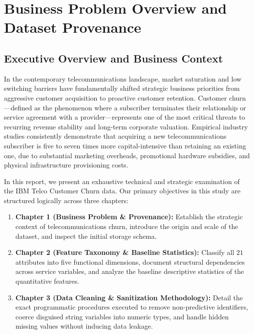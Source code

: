 \section{ Business Problem Overview and Dataset Provenance}

\subsection{Executive Overview and Business Context}
In the contemporary telecommunications landscape, market saturation and low switching barriers have fundamentally shifted strategic business priorities from aggressive customer acquisition to proactive customer retention. Customer churn---defined as the phenomenon where a subscriber terminates their relationship or service agreement with a provider---represents one of the most critical threats to recurring revenue stability and long-term corporate valuation. Empirical industry studies consistently demonstrate that acquiring a new telecommunications subscriber is five to seven times more capital-intensive than retaining an existing one, due to substantial marketing overheads, promotional hardware subsidies, and physical infrastructure provisioning costs.

In this report, we present an exhaustive technical and strategic examination of the IBM Telco Customer Churn data. Our primary objectives in this study are structured logically across three chapters:
\begin{enumerate}
    \item \textbf{Chapter 1 (Business Problem \& Provenance):} Establish the strategic context of telecommunications churn, introduce the origin and scale of the dataset, and inspect the initial storage schema.
    \item \textbf{Chapter 2 (Feature Taxonomy \& Baseline Statistics):} Classify all $21$ attributes into five functional dimensions, document structural dependencies across service variables, and analyze the baseline descriptive statistics of the quantitative features.
    \item \textbf{Chapter 3 (Data Cleaning \& Sanitization Methodology):} Detail the exact programmatic procedures executed to remove non-predictive identifiers, coerce disguised string variables into numeric types, and handle hidden missing values without inducing data leakage.
\end{enumerate}

